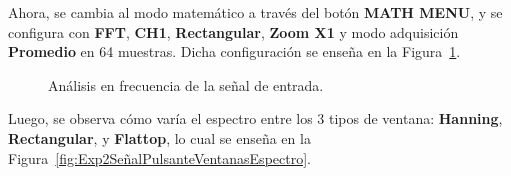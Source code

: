     Ahora, se cambia al modo matemático a través del botón \textbf{MATH MENU}, y se configura con \textbf{FFT}, 
    \textbf{CH1}, \textbf{Rectangular}, \textbf{Zoom X1} y modo adquisición \textbf{Promedio} en 64 muestras. 
    Dicha configuración se enseña en la Figura~\ref{fig:Exp2SeñalPulsanteEspectro}.

      \begin{figure}[H]
        \centering
          \caption{Análisis en frecuencia de la señal de entrada.}
          \label{fig:Exp2SeñalPulsanteEspectro}
      \end{figure}

      Luego, se observa cómo varía el espectro entre los 3 tipos de ventana: \textbf{Hanning}, \textbf{Rectangular}, 
      y \textbf{Flattop}, lo cual se enseña en la Figura~\ref{fig:Exp2SeñalPulsanteVentanasEspectro}.

